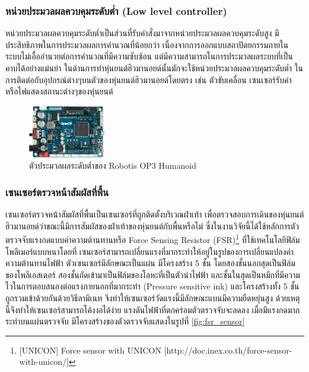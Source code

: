 \subsubsection*{หน่วยประมวลผลควบคุมระดับต่ำ (Low level controller)}
หน่วยประมวลผลควบคุมระดับต่ำเป็นส่วนที่รับคำสั่งมาจากหน่วยประมวลผลควบคุมระดับสูง
มีประสิทธิภาพในการประมวลผลการคำนวณที่น้อยกว่า เนื่องจากการออกแบบสถาปัตยกรรมภายในระบบไม่เอื้ออำนวยต่อการคำนวณที่มีความซับซ้อน
แต่มีความสามารถในการประมวลผลระบบที่เป็นคาบได้อย่างแม่นยำ ในด้านการทำหุ่นยนต์ฮิวมานอยด์นั้นมักจะใช้หน่วยประมวลผลควบคุมระดับต่ำ
ในการติดต่อกับอุปกรณ์ต่างๆบนตัวของหุ่นยนต์ฮิวมานอยด์โดยตรง เช่น ตัวขับเคลื่อน เซนเซอร์รับค่า หรือไฟแสดงสถานะต่างๆของหุ่นยนต์
\begin{figure}[!ht]
    \centering
    \includegraphics[width=0.30\textwidth]{chapter2/images/opencr_op3.png}
    \caption{ตัวประมวลผลระดับต่ำของ Robotis OP3 Humanoid}
    \label{fig:opencr_op3_controller}
\end{figure}

\clearpage
\subsubsection*{เซนเซอร์ตรวจหน้าสัมผัสที่พื้น}
เซนเซอร์ตรวจหน้าสัมผัสที่พื้นเป็นเซนเซอร์ที่ถูกติดตั้งบริเวณฝ่าเท้า เพื่อตรวจสอบการเดินของหุ่นยนต์ฮิวมานอยด์ว่าขณะนี้มีการสัมผัสของฝ่าเท้าของหุ่นยนต์กับพื้นหรือไม่
ซึ่งในงานวิจัยนี้ได้ใช้หลักการตัวตรวจจับแรงกดแบบค่าความต้านทานหรือ Force Sensing Resistor (FSR)\footnote{ [UNICON] Force sensor with UNICON [http://doc.inex.co.th/force-sensor-with-unicon/] }
ที่ใช้เทคโนโลยีฟิล์มโพลีเมอร์แบบหนาโดยที่
เซนเซอร์สามารถเปลี่ยนแรงที่มากระทำให้อยู่ในรูปของการเปลี่ยนแปลงค่าความต้านทานไฟฟ้า ตัวเซนเซอร์มีลักษณะเป็นแผ่น มีโครงสร้าง 5 ชั้น
โดยสองชั้นนอกสุดเป็นฟิล์มของโพลีเอสเตอร์ สองชั้นถัดเข้ามาเป็นฟิล์มของโลหะที่เป็นตัวนำไฟฟ้า และชั้นในสุดเป็นหมึกที่มีความไวในการตอบสนองต่อแรงภายนอกที่มากระทำ
(Pressure sensitive ink) และโครงสร้างทั้ง 5 ชั้น ถูกรวมเข้าด้วยกันด้วยวิธีลามิเนท จึงทำให้เซนเซอร์วัดแรงนี้มีลักษณะแบนมีความยืดหยุ่นสูง
ด้วยเหตุนี้จึงทำให้เซนเซอร์สามารถโค้งงอได้ง่าย แรงดันไฟฟ้าที่ตกคร่อมตัวตรวจจับจะลดลง เมื่อมีแรงกดมากระทำบนแผ่นตรวจจับ มีโครงสร้างของตัวตรวจจับแสดงในรูปที่ \ref{fig:fsr_sensor} 

